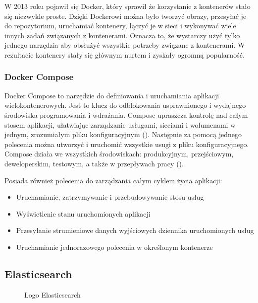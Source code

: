W 2013 roku pojawił się Docker, który sprawił że korzystanie z kontenerów stało się niezwykle proste. Dzięki Dockerowi można było tworzyć obrazy, przesyłać je do repozytorium, uruchamiać kontenery, łączyć je w sieci i wykonywać wiele innych zadań związanych z kontenerami. Oznacza to, że wystarczy użyć tylko jednego narzędzia aby obsłużyć wszystkie potrzeby związane z kontenerami. W rezultacie kontenery stały się głównym nurtem i zyskały ogromną popularność\cite{dockerContenerizationKeyAndUseCases}\cite{dockerOverview}.

\subsubsection{Docker Compose}

Docker Compose to narzędzie do definiowania i uruchamiania aplikacji wielokontenerowych. Jest to klucz do odblokowania usprawnionego i wydajnego środowiska programowania i wdrażania.
Compose upraszcza kontrolę nad całym stosem aplikacji, ułatwiając zarządzanie usługami, sieciami i wolumenami w jednym, zrozumiałym pliku konfiguracyjnym  (). Następnie za pomocą jednego polecenia można utworzyć i uruchomić wszystkie usugi z pliku konfiguracyjnego. Compose działa we wszystkich środowiskach: produkcyjnym, przejściowym, deweloperskim, testowym, a także w przepływach pracy  ()\cite{dockerComposeAStudyMultiContainerSystem}\cite{dockerComposeOverview}\cite{dockerComposePaterns}.

Posiada również polecenia do zarządzania całym cyklem życia aplikacji: 
\begin{itemize}
    \item Uruchamianie, zatrzymywanie i przebudowywanie stosu usług
    \item Wyświetlenie stanu uruchomionych aplikacji
    \item Przesyłanie strumieniowe danych wyjściowych dziennika uruchomionych usług
    \item Uruchamianie jednorazowego polecenia w określonym kontenerze
\end{itemize}

\subsection{ Elasticsearch }

\begin{figure}[!htbp]
    \centering
    
    \caption{Logo Elasticsearch \cite{elasticSearchManualDataIn}}
    \label{fig:enter-label}
\end{figure}


